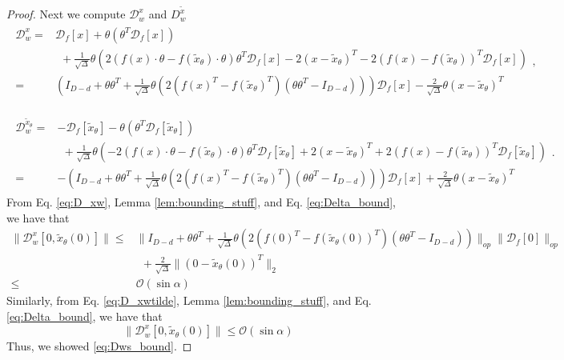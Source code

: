 \documentclass[12pt]{article}
\theoremstyle{remark}
\newcommand{\DD}{\mathcal{D}}
\newcommand{\OO}{\mathcal{O}}
\newcommand{\wtilde}[1]{\widetilde{#1}}
\begin{document}
\begin{appendices}
\begin{proof}
Next we compute $\DD^x_w$ and $D^{\wtilde{x}}_ w$
\begin{align}\label{eq:D_xw}
    \begin{split}
     \DD^x_w =& \DD_f[x] 
    +
    \theta {(\theta^T \DD_f[x])} \\
    &~~+
    {\frac{1}{\sqrt{\Delta}}} \theta \left( 
    2 {(f(x)\cdot \theta - f(\wtilde{x}_\theta) \cdot \theta)}{\theta^T \DD_f[x]} 
    - 
    2(x- \wtilde{x}_\theta)^T 
    - 
    2(f(x)- f(\wtilde{x}_\theta))^T\DD_f[x]  \right)\\
    =&\left(I_{D-d} 
    +
    \theta \theta^T  
    +
    \frac{1}{\sqrt{\Delta}} \theta \left( 
    2 (f(x)^T- f(\wtilde{x}_\theta)^T ) (\theta \theta^T - I_{D-d} )
      \right)\right) \DD_f[x] -
    \frac{2}{\sqrt{\Delta}} \theta (x- \wtilde{x}_\theta)^T 
    \end{split}
,\end{align}

\begin{align}\label{eq:D_xwtilde}
    \begin{split}
    \DD^{\wtilde{x}_\theta}_ w = & -\DD_f[\wtilde{x}_\theta] 
    - 
    \theta {(\theta^T \DD_f[\wtilde{x}_\theta])} \\
    &~~+
    {\frac{1}{\sqrt{\Delta}}} \theta \left( 
    -2 {(f(x)\cdot \theta - f(\wtilde{x}_\theta) \cdot \theta)}{\theta^T \DD_f[\wtilde{x}_\theta]} 
    + 
    2(x- \wtilde{x}_\theta)^T 
    +
    2(f(x)- f(\wtilde{x}_\theta))^T\DD_f[\wtilde{x}_\theta]  \right)\\
    =&-\left(I_{D-d} 
    +
    \theta \theta^T  
    +
    \frac{1}{\sqrt{\Delta}} \theta \left( 
    2 (f(x)^T- f(\wtilde{x}_\theta)^T ) (\theta \theta^T - I_{D-d} )
      \right)\right) \DD_f[x] +
    \frac{2}{\sqrt{\Delta}} \theta (x- \wtilde{x}_\theta)^T 
    \end{split}
.\end{align}
From Eq. \eqref{eq:D_xw}, Lemma \ref{lem:bounding_stuff}, and Eq. \eqref{eq:Delta_bound},  we have that 
\begin{align*}
     \|\DD^x_w[0,\wtilde x_\theta(0)]\| \leq& 
    \|I_{D-d} 
    +
    \theta \theta^T  
    +
    \frac{1}{\sqrt{\Delta}} \theta \left( 
    2 (f(0)^T- f(\wtilde{x}_\theta(0))^T ) (\theta \theta^T - I_{D-d} )
      \right)\|_{op} \|\DD_f[0]\|_{op} \\
      &~~+
    \frac{2}{\sqrt{\Delta}} \|(0- \wtilde{x}_\theta(0))^T\|_2 
    \\
    \leq& \OO( \sin \alpha)
\end{align*}
Similarly, from Eq. \eqref{eq:D_xwtilde}, Lemma \ref{lem:bounding_stuff}, and Eq. \eqref{eq:Delta_bound},  we have that 
\begin{equation}
     \|\DD^x_w[0,\wtilde x_\theta(0)]\| 
    \leq \OO( \sin \alpha)
\end{equation}
Thus, we showed \eqref{eq:Dws_bound}.



\end{proof}
\end{appendices}
\end{document}
